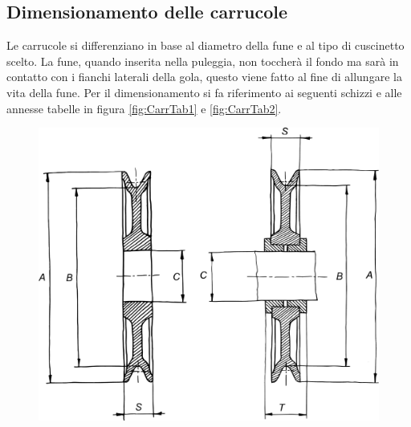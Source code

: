 \subsection{Dimensionamento delle carrucole}
Le carrucole si differenziano in base al diametro della fune e al tipo di cuscinetto scelto. La fune, quando inserita nella puleggia, non toccherà il fondo ma sarà in contatto con i fianchi laterali della gola, questo viene fatto al fine di allungare la vita della fune. Per il dimensionamento si fa riferimento ai seguenti schizzi e alle annesse tabelle in figura \ref{fig:CarrTab1} e \ref{fig:CarrTab2}. 
\begin{figure}[H]
\centering
\begin{minipage}{.55\textwidth}
  \centering
  \includegraphics[width=.9\linewidth]{imgs/Carr1}
  \label{fig:Carr1}
\end{minipage}%
\begin{minipage}{.35\textwidth}
  \centering

\end{minipage}
\end{figure}
